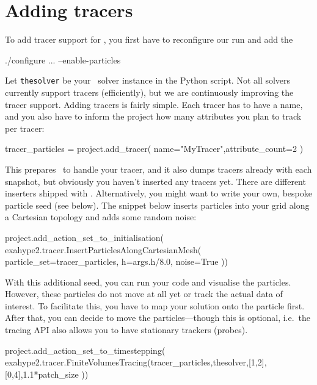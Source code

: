 \section{Adding tracers}

To add tracer support for \ExaHyPE, you first have to reconfigure our run and
add the 
\begin{code}
./configure ... --enable-particles
\end{code}

\noindent
Let \texttt{thesolver} be your \ExaHyPE\ solver instance in the Python script.
Not all solvers currently support tracers (efficiently), but we are continuously
improving the tracer support.
Adding tracers is fairly simple.
Each tracer has to have a name, and you also have to inform the project how many
attributes you plan to track per tracer:

\begin{code}
tracer_particles = project.add_tracer( name="MyTracer",attribute_count=2 )
\end{code} 


\noindent
This prepares \ExaHyPE\ to handle your tracer, and it also dumps tracers already
with each snapshot, but obviously you haven't inserted any tracers yet. 
There are different inserters shipped with \ExaHyPE. 
Alternatively, you might want to write your own, bespoke particle seed (see
below).
The snippet below inserts particles into your grid along a Cartesian topology
and adds some random noise:


\begin{code}
project.add_action_set_to_initialisation( 
 exahype2.tracer.InsertParticlesAlongCartesianMesh( 
  particle_set=tracer_particles,
  h=args.h/8.0, noise=True 
))
\end{code}



\noindent
With this additional seed, you can run your code and visualise the particles. 
However, these particles do not move at all yet or track the actual data of
interest.
To facilitate this, you have to map your solution onto the particle first.
After that, you can decide to move the particles---though this is optional,
i.e.~the tracing API also allows you to have stationary trackers (probes).


\begin{code}
project.add_action_set_to_timestepping(
 exahype2.tracer.FiniteVolumesTracing(tracer_particles,thesolver,[1,2],[0,4],1.1*patch_size
))
\end{code}


